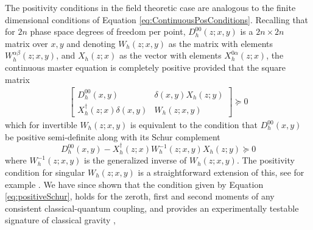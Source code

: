 \documentclass[aps,pra,showpacs,citeautoscript,amsmath,amssymb,floatfix,superscriptaddress,bbm, verbatim,amsfonts,changes,11pt,nofootinbib,longbibliography]{revtex4-2}
\def\z{{z}}
\def\rate{{W}}
\def\ab{^{\alpha\beta}}
\begin{document}
The positivity conditions in the field theoretic case are analogous to the finite dimensional conditions of Equation \eqref{eq:ContinuousPosConditions}. Recalling that for $2n$ phase space degrees of freedom per point, $D_{h}^{00}(\z;x,y)$ is a $2n\times 2n$ matrix over $x,y$ and denoting $\rate_h(\z;x,y)$ as the matrix with elements  $\rate_h\ab(\z;x,y)$, and $X_h(\z;x)$ as the vector with elements $X_h^{0\alpha}(\z;x)$, the continuous master equation is completely positive
provided that the square matrix
\begin{align}
\label{eq:positivity_continuous_field}
\begin{bmatrix}
D_h^{00}(x,y) & \delta(x,y) X_h(\z;y)\\ X_h^\dagger(\z;x)\delta(x,y) & \rate_h(\z;x,y)
\end{bmatrix} 
 \succeq 0 
\end{align}
which for invertible $\rate_h(\z;x,y)$ is equivalent to the condition that $D_h^{00}(x,y)$ be positive semi-definite along with its Schur complement
\begin{equation}
D_h^{00}(x,y) - X_h^\dagger(\z;x)\rate_h^{-1}(\z;x,y) X_h(\z;y) \succeq 0
 \label{eq:positiveSchur}
\end{equation}
where $\rate_h^{-1}(\z;x,y)$ is the generalized inverse of $\rate_h(\z;x,y)$. The positivity condition for singular $\rate_h(\z;x,y)$ is a straightforward extension of this, see for example  \cite{boyd2004convex}. We have since shown that the condition given by Equation \eqref{eq:positiveSchur}, holds for the zeroth, first and second moments of any consistent classical-quantum coupling, and provides an experimentally testable signature of classical gravity \cite{oppenheim2021gravitationally},
\end{document}
